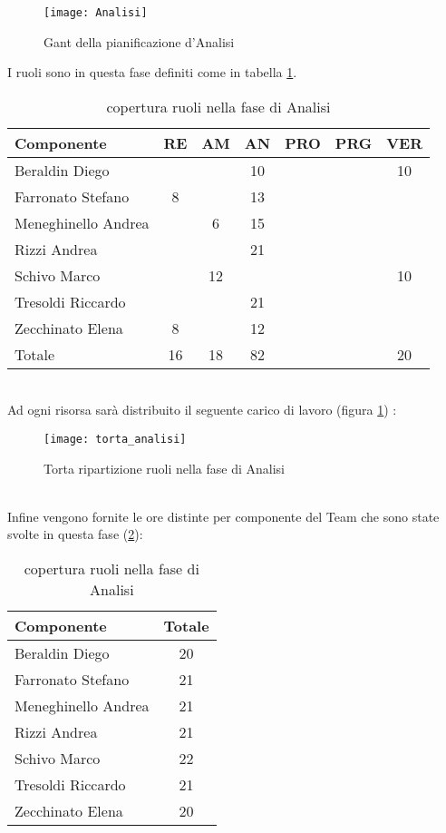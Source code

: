 \begin{figure}[h!]
  \texttt{[image: Analisi]}
\caption{Gant della pianificazione d'Analisi}
\end{figure}
\clearpage
I ruoli sono in questa fase definiti come in tabella \ref{tab:ruolian}.
\begin{table}[h!]
\centering
\begin{tabular}{|l|c|c|c|c|c|c|}
\hline
Componente& RE& AM& AN& PRO& PRG& VER\\
\hline
Beraldin Diego & & & 10& & & 10\\
Farronato Stefano & 8& & 13& & & \\
Meneghinello Andrea & & 6& 15& & & \\
Rizzi Andrea & & & 21& & & \\
Schivo Marco & & 12& & & & 10\\
Tresoldi Riccardo & & & 21& & & \\
Zecchinato Elena & 8& & 12& & & \\
\hline
Totale & 16& 18& 82& & & 20\\
\hline
\end{tabular}
\caption{copertura ruoli nella fase di Analisi}\label{tab:ruolian}
\end{table}\\
Ad ogni risorsa sarà distribuito il seguente carico di lavoro (figura \ref{fig:ruolian}) :\\
\begin{figure}[h!]
\centering
  \texttt{[image: torta\_analisi]}
\caption{Torta ripartizione ruoli nella fase di Analisi}\label{fig:ruolian}
\end{figure}\\
Infine vengono fornite le ore distinte per componente del Team che sono state svolte in questa fase (\ref{tab:ruolian2}):\\
\begin{table}[h!]
\centering
\begin{tabular}{|l|c|}
\hline
Componente& Totale\\
\hline
Beraldin Diego & 20\\
Farronato Stefano & 21\\
Meneghinello Andrea & 21\\
Rizzi Andrea &  21\\
Schivo Marco & 22\\
Tresoldi Riccardo & 21\\
Zecchinato Elena & 20\\
\hline
\end{tabular}
\caption{copertura ruoli nella fase di Analisi}\label{tab:ruolian2}
\end{table}

